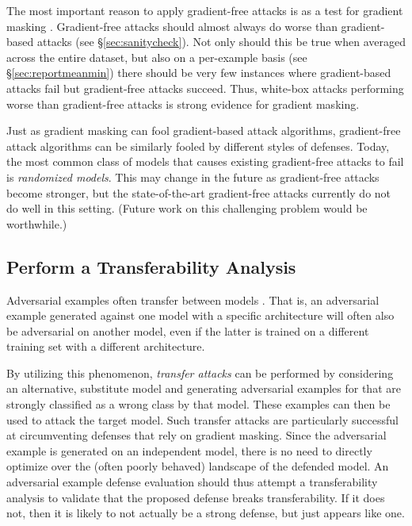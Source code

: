 \documentclass{article} %
\begin{document}
The most important reason to apply gradient-free attacks is as a test
for gradient masking \citep{tramer2017ensemble,athalye2018obfuscated,uesato2018adversarial}.
%
Gradient-free attacks should almost always do worse than gradient-based
attacks (see \S\ref{sec:sanitycheck}).
%
Not only
should this be true when averaged across the entire dataset, but
also on a per-example basis (see \S\ref{sec:reportmeanmin}) there
should be very few instances where gradient-based attacks fail but
gradient-free attacks succeed.
%
Thus, white-box attacks performing
worse than gradient-free attacks is strong evidence for gradient masking.

Just as gradient masking can fool gradient-based attack algorithms,
gradient-free attack algorithms can be similarly fooled by different
styles of defenses.
%
Today, the most common class of models that causes existing
gradient-free attacks to fail is \emph{randomized models}.
%
This may change in the future as gradient-free attacks become stronger,
but the state-of-the-art gradient-free attacks currently do not do well in this setting.
%
(Future work on this challenging problem would be worthwhile.)

\subsection{Perform a Transferability Analysis}
\label{sec:transfer}

Adversarial examples often
transfer between models \citep{papernot2016transferability}.
%
That is, an adversarial example generated
against one model with a specific architecture will
often also be adversarial on another model, even if the latter is trained on a
different training set with a different architecture.

By utilizing this phenomenon, \emph{transfer attacks} can be performed by considering
an alternative, substitute model and generating adversarial examples for that are strongly
classified as a wrong class by that model.
%
These examples can then be used to attack the target model.
%
Such transfer attacks are particularly successful at circumventing
defenses that rely on gradient masking.
%
Since the adversarial example is generated on an independent model, there is no
need to directly optimize over the (often poorly behaved) landscape of the defended model.
%
An adversarial example defense evaluation should thus attempt a
transferability analysis to validate that the proposed
defense breaks transferability.
%
If it does not, then it is likely to
not actually be a strong defense, but just appears like one.
\end{document}
